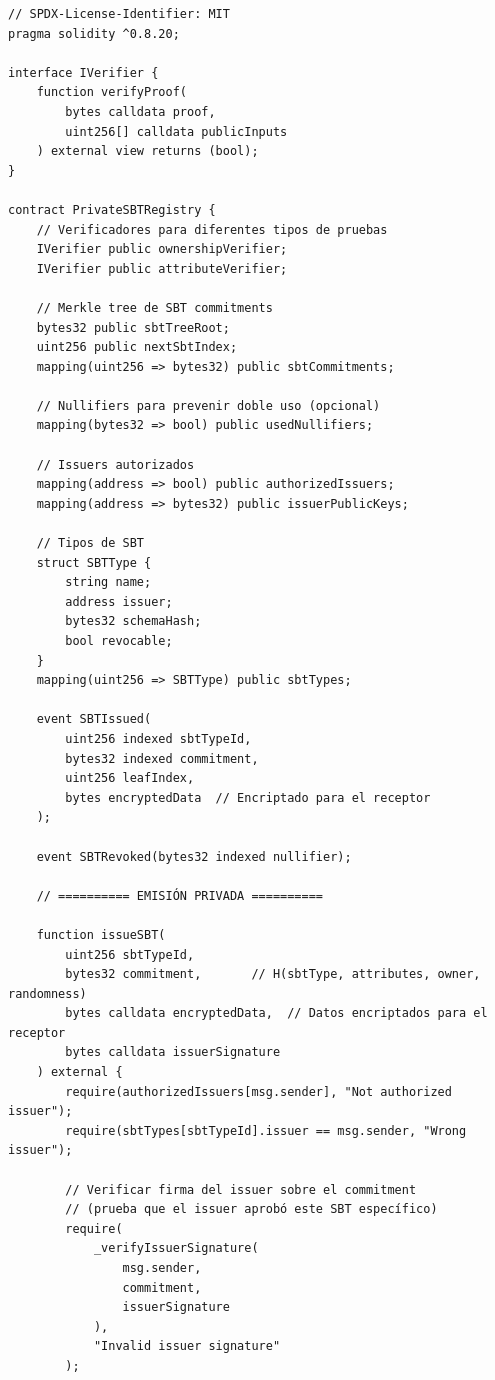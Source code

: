 \documentclass[11pt,a4paper,twoside]{book}
\theoremstyle{definition}
\theoremstyle{remark}
\begin{document}
\begin{lstlisting}[language=Solidity, caption={Private SBT Registry con ZK}]
// SPDX-License-Identifier: MIT
pragma solidity ^0.8.20;

interface IVerifier {
    function verifyProof(
        bytes calldata proof,
        uint256[] calldata publicInputs
    ) external view returns (bool);
}

contract PrivateSBTRegistry {
    // Verificadores para diferentes tipos de pruebas
    IVerifier public ownershipVerifier;
    IVerifier public attributeVerifier;
    
    // Merkle tree de SBT commitments
    bytes32 public sbtTreeRoot;
    uint256 public nextSbtIndex;
    mapping(uint256 => bytes32) public sbtCommitments;
    
    // Nullifiers para prevenir doble uso (opcional)
    mapping(bytes32 => bool) public usedNullifiers;
    
    // Issuers autorizados
    mapping(address => bool) public authorizedIssuers;
    mapping(address => bytes32) public issuerPublicKeys;
    
    // Tipos de SBT
    struct SBTType {
        string name;
        address issuer;
        bytes32 schemaHash;
        bool revocable;
    }
    mapping(uint256 => SBTType) public sbtTypes;
    
    event SBTIssued(
        uint256 indexed sbtTypeId,
        bytes32 indexed commitment,
        uint256 leafIndex,
        bytes encryptedData  // Encriptado para el receptor
    );
    
    event SBTRevoked(bytes32 indexed nullifier);
    
    // ========== EMISIÓN PRIVADA ==========
    
    function issueSBT(
        uint256 sbtTypeId,
        bytes32 commitment,       // H(sbtType, attributes, owner, randomness)
        bytes calldata encryptedData,  // Datos encriptados para el receptor
        bytes calldata issuerSignature
    ) external {
        require(authorizedIssuers[msg.sender], "Not authorized issuer");
        require(sbtTypes[sbtTypeId].issuer == msg.sender, "Wrong issuer");
        
        // Verificar firma del issuer sobre el commitment
        // (prueba que el issuer aprobó este SBT específico)
        require(
            _verifyIssuerSignature(
                msg.sender,
                commitment,
                issuerSignature
            ),
            "Invalid issuer signature"
        );
        

\end{lstlisting}
\end{document}
